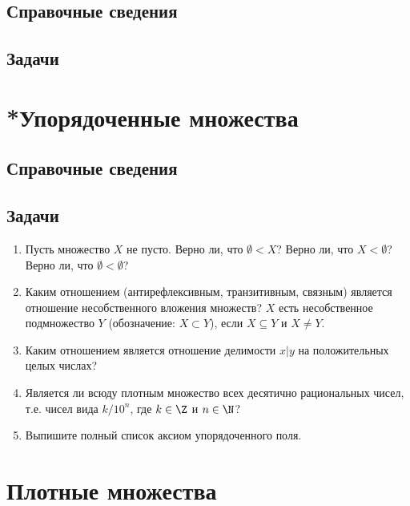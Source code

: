 \subsection*{Справочные сведения}

\subsection*{Задачи}



\begin{comment}
\chapter{14. Алгебраические числа}
\end{comment}


\section{*Упорядоченные множества}\label{Ordering}

\subsection*{Справочные сведения}

\subsection*{Задачи}

\begin{enumerate}
\item Пусть множество $X$ не пусто. Верно ли, что $\emptyset<X$? Верно ли, что $X<\emptyset$? Верно ли, что $\emptyset<\emptyset$?
\item Каким отношением (антирефлексивным, транзитивным, связным) является отношение несобственного вложения множеств? $X$ есть несобственное подмножество $Y$ (обозначение: $X\subset Y$), если $X\subseteq Y$ и $X\ne Y$.
\item Каким отношением является отношение делимости $x|y$ на положительных целых числах?
\item Является ли всюду плотным множество всех десятично рациональных чисел, т.е. чисел вида $k/10^n$, где $k\in \Z$ и $n\in\N$?
\item Выпишите полный список аксиом упорядоченного поля.
\end{enumerate}


\section{Плотные множества}

